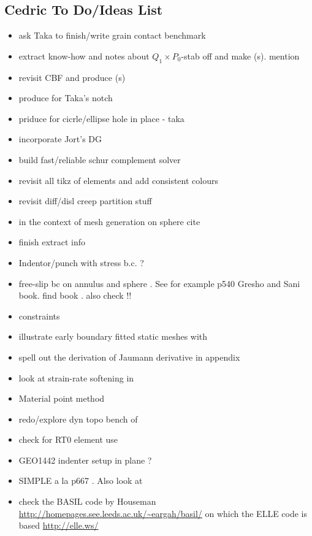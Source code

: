 \subsection{Cedric To Do/Ideas List}

\begin{itemize}
\item ask Taka to finish/write grain contact benchmark
\item extract know-how and notes about $Q_1 \times P_0$-stab off \elefant and 
make \stone(s). mention \cite{lisi12}
\item revisit CBF and produce \stone(s)
\item produce \stone for Taka's notch
\item priduce \stone for cicrle/ellipse hole in place - taka
\item incorporate Jort's DG 
\item build fast/reliable schur complement solver
\item revisit all tikz of elements and add consistent colours
\item revisit diff/disl creep partition stuff
\item in the context of mesh generation on sphere cite \cite{moma19}
\item finish extract info 
\item Indentor/punch with stress b.c. ?
\item free-slip bc on annulus and sphere . See for example p540 Gresho and Sani book. find book \cite{deab72}.
also check \cite{ensg82} !!
\item constraints \cite{absh79}
\item illustrate early boundary fitted static meshes with \cite{thar85}
\item \cite{bepo10} spell out the derivation of Jaumann derivative in appendix
\item look at strain-rate softening in \cite{belz02}
\item Material point method \cite{sucs94,susc96,susp07}
\item redo/explore dyn topo bench of \cite{bore19}
\item check \cite{bufm19} for RT0 element use
\item GEO1442 indenter setup in plane ?
\item SIMPLE a la p667 \cite{john16}. Also look at \cite{vusb00} 
\item check the BASIL code by Houseman \etal \url{http://homepages.see.leeds.ac.uk/~eargah/basil/}
on which the ELLE code is based \url{http://elle.ws/} 

\end{itemize}

